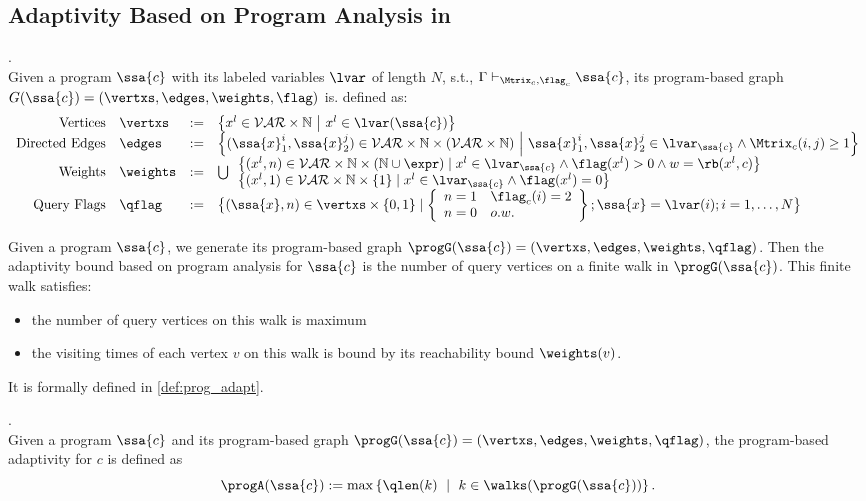 \subsection{Adaptivity Based on Program Analysis in \THESYSTEM}
%
\begin{defn}
.
\label{def:prog-based_graph}
\\
Given a program $\ssa{c}$ with its labeled variables $\lvar$ of length $N$, s.t.,
$\Gamma \vdash_{\Mtrix_c, \flag_c} \ssa{c}$, 
its program-based graph 
$G(\ssa{c}) = (\vertxs, \edges, \weights, \flag)$ is. defined as:
\\
\[
\begin{array}{rlcl}
\text{Vertices} &
\vertxs & := & \left\{ 
x^l \in \mathcal{VAR} \times \mathbb{N}
~ \middle\vert ~
x^l \in \lvar({\ssa{c}})
\right\}
\\
\text{Directed Edges} &
\edges & := & 
\left\{ 
  (\ssa{x}_1^{i}, \ssa{x}_2^{j}) \in \mathcal{VAR} \times \mathbb{N} \times (\mathcal{VAR} \times \mathbb{N})
  ~ \middle\vert ~
 	\ssa{x}_1^{i}, \ssa{x}_2^{j} \in \lvar_{\ssa{c}}
	\land \Mtrix_c(i, j) \geq 1
\right\}
\\
\text{Weights} &
\weights & := &
\bigcup
\begin{array}{l}
	\big\{ (x^l, n) \in \mathcal{VAR} \times \mathbb{N} \times (\mathbb{N} \cup \expr)
	\mid
	x^l \in \lvar_{\ssa{c}} \land \flag(x^l) > 0 \land w = \rb(x^l, c)
	\big\} 
	\\
	\big\{(x^l, 1)  \in \mathcal{VAR} \times \mathbb{N} \times \{1\} 
	\mid
	x^l \in \lvar_{\ssa{c}} \land \flag(x^l) = 0
	\big\}
\end{array} 
\\
\text{Query Flags} &
\qflag & := & 
\big\{(\ssa{x}, n)  \in \vertxs \times \{0, 1\} 
\mid 
\left\{
\begin{array} {ll}
n = 1 & \flag_c(i) = 2
\\  
n = 0 & o.w.
\end{array}
\right\};
\ssa{x} = \lvar(i); i = 1, \ldots, N
\big\}
\end{array}
\]
\end{defn} 
%
Given a program $\ssa{c}$, we generate its program-based graph 
$\progG(\ssa{c}) = (\vertxs, \edges, \weights, \qflag)$.
%
Then the adaptivity bound based on program analysis for $\ssa{c}$ is the number of query vertices on a finite walk in $\progG(\ssa{c})$. This finite walk satisfies:
\begin{itemize}
\item the number of query vertices on this walk is maximum
\item the visiting times of each vertex $v$ on this walk is bound by its reachability bound $\weights(v)$.
\end{itemize}
It is formally defined in \ref{def:prog_adapt}.
%
%
\begin{defn}
.
\label{def:prog_adapt}
\\
{
Given a program $\ssa{c}$ and its program-based graph 
$\progG(\ssa{c}) = (\vertxs, \edges, \weights, \qflag)$,
%
the program-based adaptivity for $c$ is defined as%
\[
\progA(\ssa{c}) 
:= \max
\left\{ \qlen(k)\ \mid \  k\in \walks(\progG(\ssa{c}))\right \}.
\]
}
\end{defn}  

